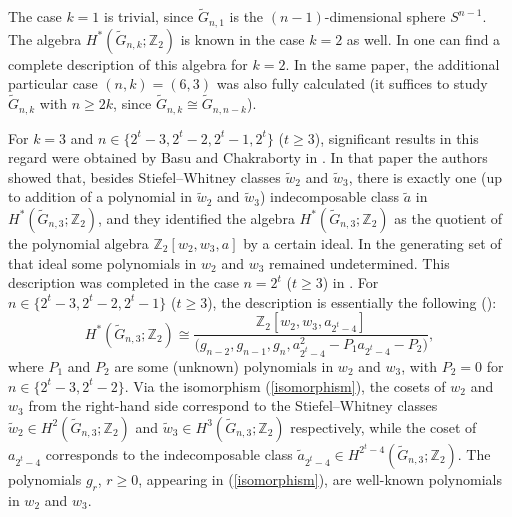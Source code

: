 \documentclass{amsart}
\theoremstyle{definition}
\theoremstyle{remark}
\numberwithin{equation}{section}
\begin{document}
The case $k=1$ is trivial, since $\widetilde G_{n,1}$ is the $(n-1)$-dimensional sphere $S^{n-1}$. The algebra $H^*(\widetilde G_{n,k};\mathbb Z_2)$ is known in the case $k=2$ as well. In \cite{KorbasRusin:Palermo} one can find a complete description of this algebra for $k=2$. In the same paper, the additional particular case $(n,k)=(6,3)$ was also fully calculated (it suffices to study $\widetilde G_{n,k}$ with $n\ge2k$, since $\widetilde G_{n,k}\cong\widetilde G_{n,n-k}$).

For $k=3$ and $n\in\{2^t-3,2^t-2,2^t-1,2^t\}$ ($t\ge3$), significant results in this regard were obtained by Basu and Chakraborty in \cite{BasuChakraborty}. In that paper the authors showed that, besides Stiefel--Whitney classes $\widetilde w_2$ and $\widetilde w_3$, there is exactly one (up to addition of a polynomial in $\widetilde w_2$ and $\widetilde w_3$) indecomposable class $\widetilde a$ in $H^*(\widetilde G_{n,3};\mathbb Z_2)$, and they identified the algebra $H^*(\widetilde G_{n,3};\mathbb Z_2)$ as the quotient of the polynomial algebra $\mathbb Z_2[w_2,w_3,a]$ by a certain ideal. In the generating set of that ideal some polynomials in $w_2$ and $w_3$ remained undetermined. This description was completed in the case $n=2^t$ ($t\ge3$) in \cite{CP}. For $n\in\{2^t-3,2^t-2,2^t-1\}$ ($t\ge3$), the description is essentially the following (\cite[Theorem B(2)]{BasuChakraborty}):
\begin{equation}\label{isomorphism}
H^*(\widetilde G_{n,3};\mathbb Z_2)\cong\frac{\mathbb Z_2[w_2,w_3,a_{2^t-4}]}{\big(g_{n-2},g_{n-1},g_n,a_{2^t-4}^2-P_1a_{2^t-4}-P_2\big)},
\end{equation}
where $P_1$ and $P_2$ are some (unknown) polynomials in $w_2$ and $w_3$, with $P_2=0$ for $n\in\{2^t-3,2^t-2\}$. Via the isomorphism (\ref{isomorphism}), the cosets of $w_2$ and $w_3$ from the right-hand side correspond to the Stiefel--Whitney classes $\widetilde w_2\in H^2(\widetilde G_{n,3};\mathbb Z_2)$ and $\widetilde w_3\in H^3(\widetilde G_{n,3};\mathbb Z_2)$ respectively, while the coset of $a_{2^t-4}$ corresponds to the indecomposable class $\widetilde a_{2^t-4}\in H^{2^t-4}(\widetilde G_{n,3};\mathbb Z_2)$. The polynomials $g_r$, $r\ge0$, appearing in (\ref{isomorphism}), are well-known polynomials in $w_2$ and $w_3$.
\end{document}
